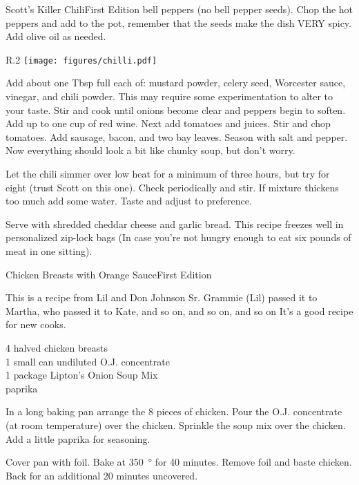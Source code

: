 \begin{entry}{Scott's Killer Chili}{First Edition}
bell peppers (no bell pepper seeds).  Chop the hot peppers and add to the pot,
remember that the seeds make the dish VERY spicy.  Add olive oil as needed.
\begin{wrapfigure}{R}{.2\textwidth}
\centering
\texttt{[image: figures/chilli.pdf]}
\end{wrapfigure}
Add about one Tbsp full each of: mustard powder, celery seed, Worcester sauce,
vinegar, and chili powder.  This may require some experimentation to alter to
your taste.  Stir and cook until onions become clear and peppers begin to
soften.  Add up to one cup of red wine.  Next add tomatoes and juices.  Stir
and chop tomatoes.  Add sausage, bacon, and two bay leaves.  Season with salt
and pepper.  Now everything should look a bit like chunky soup, but don't
worry.

Let the chili simmer over low heat for a minimum of three hours, but try for
eight (trust Scott on this one). Check periodically and stir.  If mixture
thickens too much add some water.  Taste and adjust to preference.

Serve with shredded cheddar cheese and garlic bread.  This recipe freezes well
in personalized zip-lock bags (In case you're not hungry enough to eat six
pounds of meat in one sitting).
\end{entry}

\begin{entry}{Chicken Breasts with Orange Sauce}{First Edition}

\begin{open}
  This is a recipe from Lil and Don Johnson Sr.  Grammie (Lil) passed it to Martha, who passed it to Kate, and so on, and so on, and so on\textellipsis
  It's a good recipe for new cooks.
\end{open}
\begin{ingredients}
  4 halved chicken breasts \\
  1 small can undiluted O.J. concentrate \\
  1 package Lipton's Onion Soup Mix \\
  paprika
\end{ingredients}
In a long baking pan arrange the 8 pieces of chicken.  Pour the O.J.
concentrate (at room temperature) over the chicken.  Sprinkle the soup mix
over the chicken.  Add a little paprika for seasoning.

Cover pan with foil.  Bake at \SI{350}{\degree} for 40 minutes.  Remove foil and
baste chicken.  Back for an additional 20 minutes uncovered.
\end{entry}

